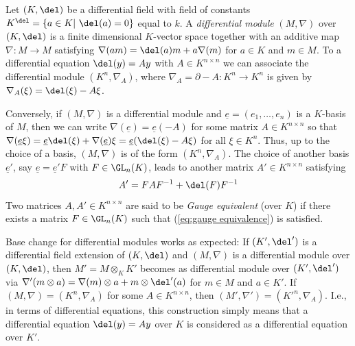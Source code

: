 \documentclass[a4paper, 11pt]{article}
\begin{document}
\medskip

%

Let $(K,\del)$ be a differential field with field of constants $K^\del=\{a\in K|\ \del(a)=0\}$ equal to $k$. A \emph{differential module} $(M,\nabla)$ over $(K,\del)$ is a finite dimensional $K$-vector space together with an additive map $\nabla\colon M\to M$ satisfying $\nabla(am)=\del(a)m+a\nabla(m)$ for $a\in K$ and $m\in M$.	
To a differential equation $\del(y)=Ay$ with $A\in K^{n\times n}$ we can associate the differential module $(K^n,\nabla_A)$, where $\nabla_A=\partial-A\colon K^n\to K^n$ is given by $\nabla_A(\xi)=\del(\xi)-A\xi$.

Conversely, if $(M,\nabla)$ is a differential module and $\underline{e}=(e_1,\ldots,e_n)$ is a $K$-basis of $M$, then
we can write $\nabla(\underline{e})=\underline{e}(-A)$ for some matrix $A\in K^{n\times n}$ so that 
$\nabla(\underline{e}\xi)=\underline{e}\del(\xi)+\nabla(\underline{e})\xi=\underline{e}(\del(\xi)-A\xi)$ for all $\xi\in K^n$. Thus, up to the choice of a basis, $(M,\nabla)$ is of the form $(K^n,\nabla_A)$. The choice of another basis $\underline{e}'$, say $\underline{e}=\underline{e}'F$ with $F\in\GL_n(K)$, leads to another matrix $A'\in K^{n\times n}$ satisfying
\begin{equation}\label{eq:gauge equivalence}
	A'=FAF^{-1}+\del(F)F^{-1} 		
\end{equation}	
Two matrices $A,A'\in K^{n\times n}$ are said to be \emph{Gauge equivalent} (over $K$) if there	exists a matrix $F\in\GL_n(K)$ such that (\ref{eq:gauge equivalence}) is satisfied.


Base change for differential modules works as expected: If $(K',\del')$ is a differential field extension of $(K,\del)$ and $(M,\nabla)$ is a differential module over $(K,\del)$, then $M'=M\otimes_{K}K'$ becomes as differential module over  $(K',\del')$ via $\nabla'(m\otimes a)=\nabla(m)\otimes a+m\otimes\del'(a)$ for $m\in M$ and $a\in K'$. If $(M,\nabla)=(K^n,\nabla_A)$ for some $A\in K^{n\times n}$, then $(M',\nabla')=(K'^n,\nabla_A)$. I.e., in terms of differential equations, this construction simply means that a differential equation $\del(y)=Ay$ over $K$ is considered as a differential equation over $K'$.
\end{document}
